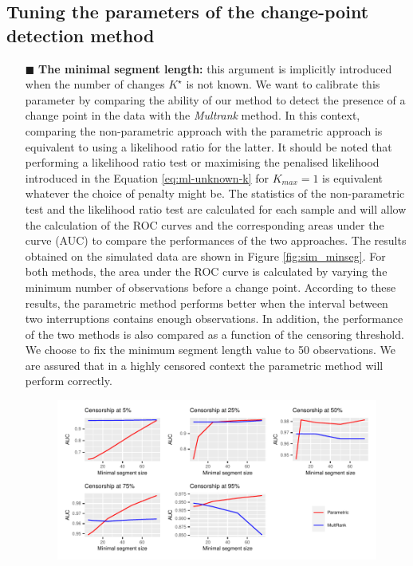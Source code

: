 \subsection{Tuning the parameters of the change-point detection method}


\begin{itemize}
    \item[$\blacksquare$] \textbf{The minimal segment length:} this argument is implicitly introduced when the number of changes $K^\star$ is not known. We want to calibrate this parameter by comparing the ability of our method to detect the presence of a change point in the data with the \textit{Multrank} method. In this context, comparing the non-parametric approach with the parametric approach is equivalent to using a likelihood ratio for the latter. It should be noted that performing a likelihood ratio test or maximising the penalised likelihood introduced in the Equation \ref{eq:ml-unknown-k} for $K_{max} = 1$ is equivalent whatever the choice of penalty might be. The statistics of the non-parametric test and the likelihood ratio test are calculated for each sample and will allow the calculation of the ROC curves \cite{Fawcett2006} and the corresponding areas under the curve (AUC) to compare the performances of the two approaches. The results obtained on the simulated data are shown in Figure \ref{fig:sim_minseg}. For both methods, the area under the ROC curve is calculated by varying the minimum number of observations before a change point. According to these results, the parametric method performs better when the interval between two interruptions contains enough observations. In addition, the performance of the two methods is also compared as a function of the censoring threshold. We choose to fix the minimum segment length value to 50 observations. We are assured that in a highly censored context the parametric method will perform correctly.   
    \begin{figure}[ht]
    \centering
    \includegraphics{figs/Chap4/sim_minseg.pdf}

\end{figure}
\end{itemize}
